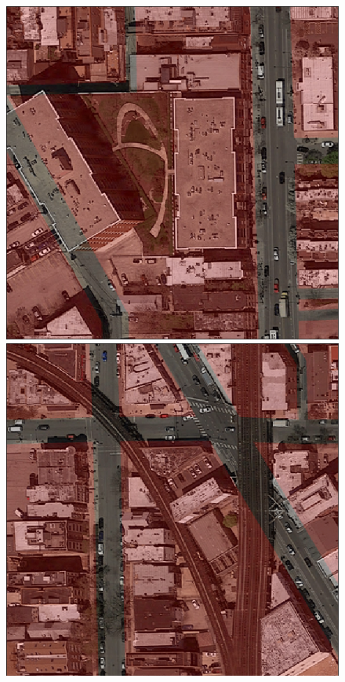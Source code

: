 \documentclass[10pt,conference,compsocconf]{IEEEtran}
\begin{document}
\begin{figure}
	\centering
	\begin{minipage}{0.2\textwidth}
		\centering
		\includegraphics[width=1\textwidth]{img/building.png}
	\end{minipage}
	\begin{minipage}{0.2\textwidth}
		\centering
		\includegraphics[width=1\textwidth]{img/highway.png}

\end{minipage}
\end{figure}
\end{document}
